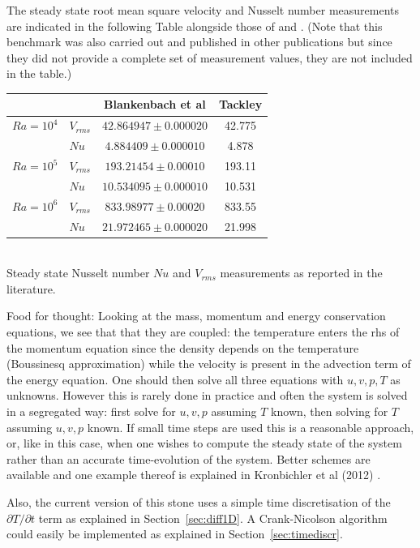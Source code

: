 The steady state root mean square velocity and Nusselt number measurements
are indicated in the following Table alongside those of \cite{blbc89} and \cite{tack94}.
(Note that this benchmark was also carried out and published in  
other publications \cite{trha98,albe00,gery10,bepo10,dawk11,lezh11} but 
since they did not provide  a complete set
of measurement values, they are not included in the table.)

\begin{center}
\begin{tabular}{llcc}
\hline
          &           & Blankenbach et al & Tackley \cite{tack94}    \\
\hline
\hline
$Ra=10^4$ & $V_{rms}$ &  $42.864947  \pm 0.000020$ & 42.775 \\
          & $Nu$      &  $4.884409   \pm 0.000010$ & 4.878  \\
$Ra=10^5$ & $V_{rms}$ &  $193.21454  \pm 0.00010 $ & 193.11 \\
          & $Nu$      &  $10.534095  \pm 0.000010$ & 10.531 \\
$Ra=10^6$ & $V_{rms}$ &  $833.98977  \pm 0.00020 $ & 833.55 \\
          & $Nu$      &  $21.972465  \pm 0.000020$ & 21.998 \\
\hline
\end{tabular}\\
{\small Steady state Nusselt number $Nu$ and $V_{rms}$ measurements as reported in the literature. }
\end{center}

Food for thought: Looking at the mass, momentum and energy conservation equations, 
we see that that they are coupled: the temperature enters the rhs of the momentum 
equation since the density depends on the temperature (Boussinesq approximation)
while the velocity is present in the advection term of the energy equation.
One should then solve all three equations with $u,v,p,T$ as unknowns. However
this is rarely done in practice and often the system is solved in a segregated way:
first solve for $u,v,p$ assuming $T$ known, then solving for $T$ assuming $u,v,p$ known.
If small time steps are used this is a reasonable approach, or, like in this case, when 
one wishes to compute the steady state of the system rather than an accurate time-evolution
of the system. Better schemes are available and one example thereof is explained in Kronbichler et al (2012) 
\cite{krhb12}.

Also, the current version of this stone uses a simple time discretisation of the $\partial T/\partial t$ term
as explained in Section~\ref{sec:diff1D}. A Crank-Nicolson algorithm could easily be 
implemented as explained in Section~\ref{sec:timediscr}.

